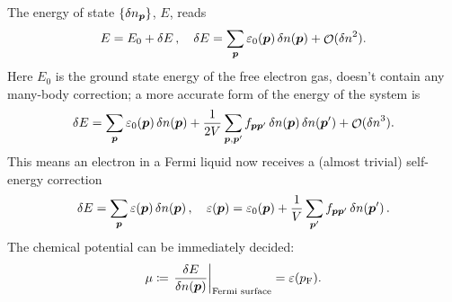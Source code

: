 \documentclass[hyperref, a4paper]{article}
\DeclareMathOperator{\bigO}{\mathcal{O}}
\newcommand*{\pfermi}{p_{\text{F}}}
\begin{document}
The energy of state $\{\var{n}_{\vb*{p}}\}$, $E$, reads 
\begin{equation}
    E = E_0 + \var{E}, \quad 
    \var{E}  = \sum_{\vb*{p}} \varepsilon_0(\vb*{p}) \var{n(\vb*{p})} + 
    \bigO(\var{n}^2).
    \label{eq:fermi-liquid.linear-energy}
\end{equation}
Here $E_0$ is the ground state energy of the free electron gas, 
 doesn't contain any many-body correction; 
a more accurate form of the energy of the system is 
\begin{equation}
    \var{E} = \sum_{\vb*{p}} \varepsilon_0(\vb*{p}) \var{n(\vb*{p})}
    + \frac{1}{2 V} \sum_{\vb*{p}, \vb*{p}'}
    f_{\vb*{p} \vb*{p}'} \var{n(\vb*{p})} \var{n(\vb*{p}')} + \bigO(\var{n}^3).
\end{equation}
This means an electron in a Fermi liquid now receives a (almost trivial) self-energy correction 
\begin{equation}
    \var{E} = \sum_{\vb*{p}} \varepsilon(\vb*{p}) \var{n(\vb*{p})} , 
    \quad \varepsilon(\vb*{p}) = \varepsilon_0(\vb*{p}) 
    + \frac{1}{V} \sum_{\vb*{p}'} f_{\vb*{p} \vb*{p}'} \var{n(\vb*{p}')}.
    \label{eq:fermi-liquid.quasiparticle-energy}
\end{equation}
The chemical potential can be immediately decided:
\begin{equation}
    \mu \coloneqq \eval{\fdv{E}{n(\vb*{p})}}_{\text{Fermi surface}} = \varepsilon(\pfermi).
\end{equation}
\end{document}
